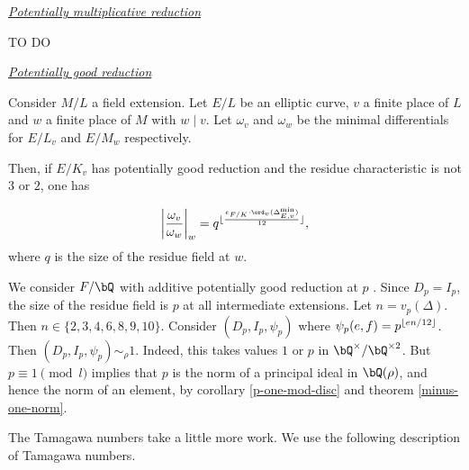 \noindent\underline{\textit{Potentially multiplicative reduction}}

{\color{red} TO DO}
\vspace{10em}


\noindent\underline{\textit{Potentially good reduction}}

\begin{lemma}
    Consider $M / L$ a field extension. Let $E / L$ be an elliptic curve, $v$ a finite place of $L$ and $w$ a finite place of $M$ with $w \mid v$. Let $\omega_v$ and $\omega_w$ be the minimal differentials for $E / L_v$ and $E / M_w$ respectively. 
    
    Then, if $E / K_v$ has potentially good reduction and the residue characteristic is not $3$ or $2$, one has
    
    \[ \left|\frac{\omega_v}{\omega_w} \right|_{w} = q^{\floor{\frac{e_{F / K} \cdot \ord_v(\Delta_{E, v}^{\min})}{12}}}, \]
    where $q$ is the size of the residue field at $w$.
\end{lemma}

We consider $F / \bQ$ with additive potentially good reduction at $p$ . Since $D_p = I_p$, the size of the residue field is $p$ at all intermediate extensions. Let $n = v_p(\Delta)$. Then $n \in \{2,3,4,6,8,9,10\}$.  Consider $(D_p, I_p, \psi_p)$ where $\psi_p(e,f) = p^{\lfloor e n / 12\rfloor}$. Then $(D_p, I_p, \psi_p) \sim_{\rho} 1$. Indeed, this takes values $1$ or $p$ in $\bQ^{\times} / \bQ^{\times 2}$. But $p \equiv 1 \pmod l$ implies that $p$ is the norm of a principal ideal in $\bQ(\rho)$, and hence the norm of an element, by corollary \ref{p-one-mod-disc} and theorem \ref{minus-one-norm}.

The Tamagawa numbers take a little more work. We use the following description of Tamagawa numbers. %

